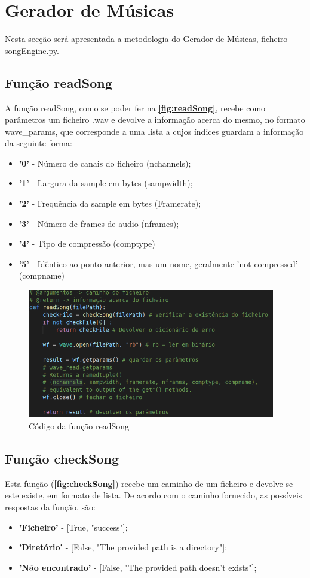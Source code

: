 \documentclass{report}
\begin{document}
\section{Gerador de Músicas}
\label{sec:songEngine}
Nesta secção será apresentada a metodologia do Gerador de Músicas, ficheiro songEngine.py.

\subsection{Função readSong}
\label{ssec:readSong}
A função readSong, como se poder fer na \textbf{\autoref{fig:readSong}}, recebe como parâmetros um ficheiro .wav e devolve a informação acerca do mesmo,
no formato wave\_params, que corresponde a uma lista a cujos índices guardam a informação da seguinte forma:
\begin{itemize}
    \item \textbf{'0'} - Número de canais do ficheiro (nchannels);
    \item \textbf{'1'} - Largura da sample em bytes (sampwidth);
    \item \textbf{'2'} - Frequência da sample em bytes (Framerate);
    \item \textbf{'3'} - Número de frames de audio (nframes);
    \item \textbf{'4'} - Tipo de compressão (comptype)
    \item \textbf{'5'} - Idêntico ao ponto anterior, mas um nome, geralmente 'not compressed' (compname)
\end{itemize}

\begin{figure}[!h]
\center 
\includegraphics[height=160pt]{img/readSong.png}
\caption{Código da função readSong}
\label{fig:readSong}
\end{figure}

\subsection{Função checkSong}
\label{ssec:checkSong}
Esta função (\textbf{\autoref{fig:checkSong}}) recebe um caminho de um ficheiro e devolve se este existe, em formato de lista. De acordo com o caminho fornecido, 
as possíveis respostas da função, são:
\begin{itemize}
    \item \textbf{'Ficheiro'} - [True, "success"];
    \item \textbf{'Diretório'} - [False, "The provided path is a directory"];
    \item \textbf{'Não encontrado'} - [False, "The provided path doesn't exists"];
\end{itemize}
\end{document}
